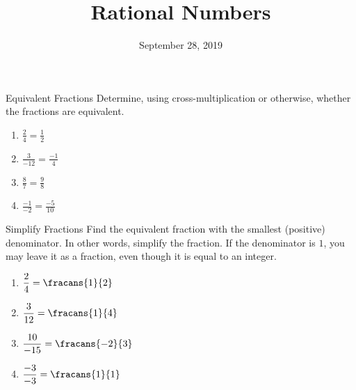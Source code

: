 \documentclass[12pt,letterpaper]{article}
\title{Rational Numbers}
\date{September 28, 2019}
\begin{document}
\maketitle

\thispagestyle{empty}

\begin{problem}{Equivalent Fractions}
  Determine, using cross-multiplication or otherwise, whether the fractions are equivalent.

  \begin{multicols}{2}
  \begin{enumerate}[\hspace{.5cm}a.]
    \item \( \displaystyle \frac{2}{4} = \frac{1}{2} \)     \hfill \TFTrue
    \item \( \displaystyle \frac{3}{-12} = \frac{-1}{4} \)  \hfill \TFTrue
    \item \( \displaystyle \frac{8}{7} = \frac{9}{8} \)     \hfill \TFTrue
    \item \( \displaystyle \frac{-1}{-2} = \frac{-5}{10} \) \hfill \TFTrue
  \end{enumerate}
  \end{multicols}
\end{problem}

\begin{problem}{Simplify Fractions}
  Find the equivalent fraction with the smallest (positive) denominator. In other words,
  simplify the fraction. If the denominator is \(1\), you may leave it as a fraction, even
  though it is equal to an integer.

  \begin{multicols}{2}
  \begin{enumerate}[\hspace{.5cm}a.]
    \item \( \displaystyle \frac{2}{4} = \fracans{1}{2} \)
    \item \( \displaystyle \frac{3}{12} = \fracans{1}{4} \)
    \item \( \displaystyle \frac{10}{-15} = \fracans{-2}{3} \)
    \item \( \displaystyle \frac{-3}{-3} = \fracans{1}{1} \)
  \end{enumerate}
  \end{multicols}
\end{problem}
\end{document}
